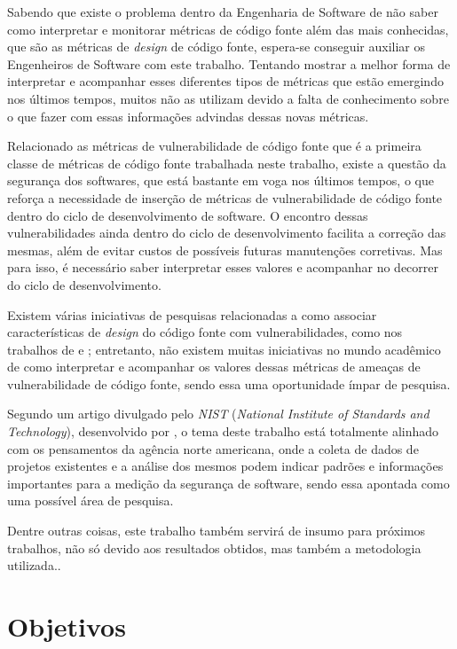 Sabendo que existe o problema dentro da Engenharia de Software de não saber como
interpretar e monitorar métricas de código fonte além das mais conhecidas, que são 
as métricas de \textit{design} de código fonte, espera-se conseguir auxiliar os 
Engenheiros de Software com este trabalho. Tentando mostrar a melhor forma de 
interpretar e acompanhar esses diferentes tipos de métricas que estão emergindo
nos últimos tempos, muitos não as utilizam devido a falta de conhecimento sobre
o que fazer com essas informações advindas dessas novas métricas.

Relacionado as métricas de vulnerabilidade de código fonte que é a primeira
classe de métricas de código fonte trabalhada neste trabalho, existe a
questão da segurança dos softwares, que está bastante em voga nos últimos
tempos, o que reforça a necessidade de inserção de métricas de vulnerabilidade
de código fonte dentro do ciclo de desenvolvimento de software. O encontro
dessas vulnerabilidades ainda dentro do ciclo de desenvolvimento facilita a
correção das mesmas, além de evitar custos de possíveis futuras manutenções
corretivas. Mas para isso, é necessário saber interpretar esses valores
e acompanhar no decorrer do ciclo de desenvolvimento.

Existem várias iniciativas de pesquisas relacionadas a como associar
características de \textit{design} do código fonte com vulnerabilidades, como
nos trabalhos de  e
; entretanto, não
existem muitas iniciativas no mundo acadêmico de como interpretar e acompanhar
os valores dessas métricas de ameaças de vulnerabilidade de código fonte, sendo
essa uma oportunidade ímpar de pesquisa.

Segundo um artigo divulgado pelo \textit{NIST} (\textit{National Institute of
Standards and Technology}), desenvolvido por , o tema
deste trabalho está totalmente alinhado com os pensamentos da agência norte
americana, onde a coleta de dados de projetos existentes e a análise dos mesmos
podem indicar padrões e informações importantes para a medição da segurança de
software, sendo essa apontada como uma possível área de pesquisa.

Dentre outras coisas, este trabalho também servirá de insumo para próximos
trabalhos, não só devido aos resultados obtidos, mas também a metodologia
utilizada..

\section{Objetivos} \label{sec:objetivos}


